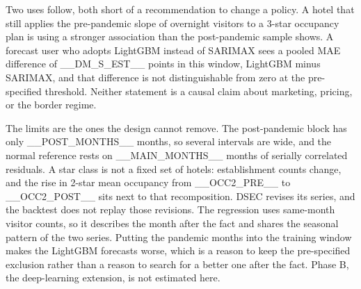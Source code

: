 \documentclass[11pt,a4paper]{article}
\begin{document}
Two uses follow, both short of a recommendation to change a policy. A hotel that still applies the pre-pandemic slope of overnight visitors to a 3-star occupancy plan is using a stronger association than the post-pandemic sample shows. A forecast user who adopts LightGBM instead of SARIMAX sees a pooled MAE difference of __DM_S_EST__ points in this window, LightGBM minus SARIMAX, and that difference is not distinguishable from zero at the pre-specified threshold. Neither statement is a causal claim about marketing, pricing, or the border regime.

The limits are the ones the design cannot remove. The post-pandemic block has only __POST_MONTHS__ months, so several intervals are wide, and the normal reference rests on __MAIN_MONTHS__ months of serially correlated residuals. A star class is not a fixed set of hotels: establishment counts change, and the rise in 2-star mean occupancy from __OCC2_PRE__ to __OCC2_POST__ sits next to that recomposition. DSEC revises its series, and the backtest does not replay those revisions. The regression uses same-month visitor counts, so it describes the month after the fact and shares the seasonal pattern of the two series. Putting the pandemic months into the training window makes the LightGBM forecasts worse, which is a reason to keep the pre-specified exclusion rather than a reason to search for a better one after the fact. Phase B, the deep-learning extension, is not estimated here.
\end{document}
